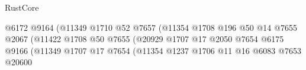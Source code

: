 \begin{lexlean}{RustCore}
\begin{coremodule}
                                                            @6172
                                                            @9164
                                                            (@11349
                                                              @1710
                                                              @52
                                                              @7657
                                                              (@11354
                                                                @1708
                                                                @196
                                                                @50
                                                                @14
                                                                @7655
                                                                @2067
                                                                (@11422
                                                                  @1708
                                                                  @50
                                                                  @7655
                                                                  (@20929
                                                                    @1707
                                                                    @17
                                                                    @2050
                                                                    @7654
                                                                    @6175
                                                                    @9166
                                                                    (@11349
                                                                      @1707
                                                                      @17
                                                                      @7654
                                                                      (@11354
                                                                        @1237
                                                                        @1706
                                                                        @11
                                                                        @16
                                                                        @6083
                                                                        @7653
                                                                        @20600

\end{coremodule}
\end{lexlean}
